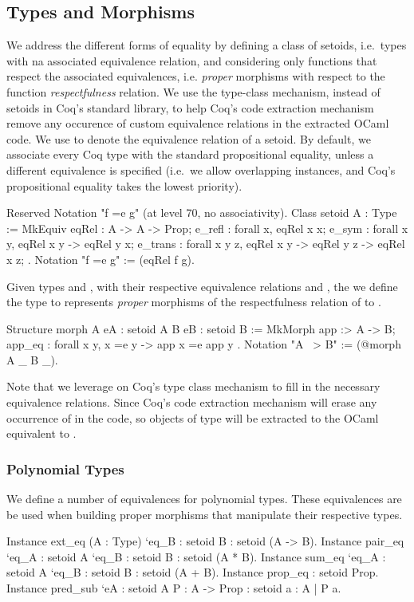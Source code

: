 \documentclass[anonymous, a4paper, UKenglish, cleveref, autoref, thm-restate]{lipics-v2021}
\begin{document}
\subsection{Types and Morphisms}
\label{sec:types-morphisms}
We address the different forms of equality by defining a class of setoids,
i.e.\ types with na associated equivalence relation, and considering only
functions that respect the associated equivalences, i.e. \emph{proper}
morphisms with respect to the function \emph{respectfulness} relation.  We use
the type-class mechanism, instead of setoids in Coq's standard library, to help
Coq's code extraction mechanism remove any occurence of custom equivalence
relations in the extracted OCaml code.  We use  to denote
the equivalence relation of a setoid. By default, we associate every Coq type
with the standard propositional equality, unless a different equivalence is
specified (i.e.\ we allow overlapping instances, and Coq's propositional
equality takes the lowest priority). 
\begin{coqcode}
Reserved Notation "f =e g" (at level 70, no associativity).
Class setoid A : Type :=
  MkEquiv
    { eqRel : A -> A -> Prop;
      e_refl : forall x, eqRel x x;
      e_sym : forall x y, eqRel x y -> eqRel y x;
      e_trans : forall x y z, eqRel x y -> eqRel y z -> eqRel x z;
    }.
Notation "f =e g" := (eqRel f g).
\end{coqcode}
Given types  and  , with their respective
equivalence relations  and
, the we define the type
 to represents \emph{proper} morphisms of the
respectfulness relation of  to .
\begin{coqcode}
Structure morph A {eA : setoid A} B {eB : setoid B} :=
  MkMorph
    { app :> A -> B;
      app_eq : forall x y, x =e y -> app x =e app y
    }.
Notation "A ~> B" := (@morph A _ B _).
\end{coqcode}
Note that we leverage on Coq's type class mechanism to fill in the necessary
equivalence relations. Since Coq's code extraction mechanism will erase any
occurrence of  in the code, so objects of type
 will be extracted to the OCaml equivalent to
.

\subsubsection{Polynomial Types}
We define a number of equivalences for polynomial types. These equivalences are
be used when building proper morphisms that manipulate their respective types.
\begin{coqcode}
Instance ext_eq (A : Type) `{eq_B : setoid B} : setoid (A -> B).
Instance pair_eq `{eq_A : setoid A} `{eq_B : setoid B} : setoid (A * B).
Instance sum_eq `{eq_A : setoid A} `{eq_B : setoid B} : setoid (A + B).
Instance prop_eq : setoid Prop.
Instance pred_sub `{eA : setoid A} {P : A -> Prop} : setoid {a : A | P a}.
\end{coqcode}
\end{document}
